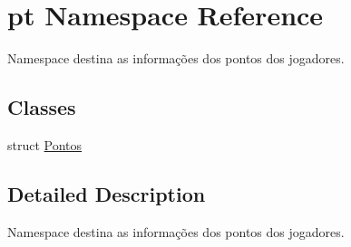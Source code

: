 \hypertarget{namespacept}{}\section{pt Namespace Reference}
\label{namespacept}


Namespace destina as informações dos pontos dos jogadores.  


\subsection*{Classes}
\begin{DoxyCompactItemize}
\item 
struct \hyperlink{structpt_1_1Pontos}{Pontos}
\end{DoxyCompactItemize}


\subsection{Detailed Description}
Namespace destina as informações dos pontos dos jogadores. 